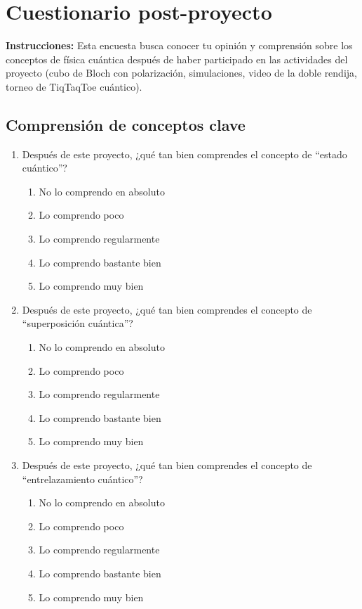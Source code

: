\documentclass[10pt,a4paper]{article}
\begin{document}
\newpage
\section{Cuestionario post-proyecto}

\noindent\textbf{Instrucciones:} Esta encuesta busca conocer tu opinión y comprensión sobre los conceptos de física cuántica después de haber participado en las actividades del proyecto (cubo de Bloch con polarización, simulaciones, video de la doble rendija, torneo de TiqTaqToe cuántico).

\hrulefill

\subsection{Comprensión de conceptos clave}
\begin{enumerate}
    \item Después de este proyecto, ¿qué tan bien comprendes el concepto de ``estado cuántico''?
    \begin{enumerate}[label=\alph*)]
        \item No lo comprendo en absoluto
        \item Lo comprendo poco
        \item Lo comprendo regularmente
        \item Lo comprendo bastante bien
        \item Lo comprendo muy bien
    \end{enumerate}
    
    \item Después de este proyecto, ¿qué tan bien comprendes el concepto de ``superposición cuántica''?
    \begin{enumerate}[label=\alph*)]
        \item No lo comprendo en absoluto
        \item Lo comprendo poco
        \item Lo comprendo regularmente
        \item Lo comprendo bastante bien
        \item Lo comprendo muy bien
    \end{enumerate}
    
    \item Después de este proyecto, ¿qué tan bien comprendes el concepto de ``entrelazamiento cuántico''?
    \begin{enumerate}[label=\alph*)]
        \item No lo comprendo en absoluto
        \item Lo comprendo poco
        \item Lo comprendo regularmente
        \item Lo comprendo bastante bien
        \item Lo comprendo muy bien
    \end{enumerate}
    

\end{enumerate}
\end{document}
